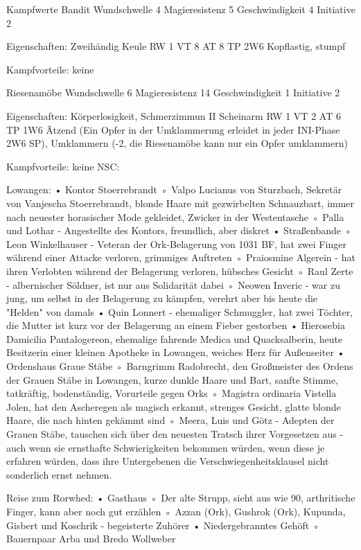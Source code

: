 Kampfwerte
Bandit
Wundschwelle 4
Magieresistenz 5
Geschwindigkeit 4
Initiative 2

Eigenschaften: Zweihändig
Keule		RW 1	VT 8	AT 8	TP 2W6
	Kopflastig, stumpf

Kampfvorteile: keine

Riesenamöbe
Wundschwelle 6
Magieresistenz 14
Geschwindigkeit 1
Initiative 2

Eigenschaften: Körperlosigkeit, Schmerzimmun II
Scheinarm	RW 1	VT 2	AT 6	TP 1W6
	Ätzend (Ein Opfer in der Umklammerung erleidet in jeder INI-Phase 2W6 SP), 	Umklammern (-2, die Riesenamöbe kann nur ein Opfer umklammern)

Kampfvorteile: keine
NSC:

Lowangen:
    • Kontor Stoerrebrandt
        ◦ Valpo Lucianus von Sturzbach, Sekretär von Vanjescha Stoerrebrandt, blonde Haare mit gezwirbelten Schnauzbart, immer nach neuester horasischer Mode gekleidet, Zwicker in der Westentasche
        ◦ Palla und Lothar - Angestellte des Kontors, freundlich, aber diskret
    • Straßenbande
        ◦ Leon Winkelhauser - Veteran der Ork-Belagerung von 1031 BF, hat zwei Finger während einer Attacke verloren, grimmiges Auftreten
        ◦ Praiosmine Algerein - hat ihren Verlobten während der Belagerung verloren, hübsches Gesicht
        ◦ Raul Zerte - albernischer Söldner, ist nur aus Solidarität dabei
        ◦ Neowen Inveric - war zu jung, um selbst in der Belagerung zu kämpfen, verehrt aber bis heute die "Helden" von damals
    • Quin Lonnert - ehemaliger Schmuggler, hat zwei Töchter, die Mutter ist kurz vor der Belagerung an einem Fieber gestorben
    • Hierosebia Damicilia Pantalogereon, ehemalige fahrende Medica und Quacksalberin, heute Besitzerin einer kleinen Apotheke in Lowangen, weiches Herz für Außenseiter
    • Ordenshaus Graue Stäbe
        ◦ Barngrimm Radobrecht, den Großmeister des Ordens der Grauen Stäbe in Lowangen, kurze dunkle Haare und Bart, sanfte Stimme, tatkräftig, bodenständig, Vorurteile gegen Orks
        ◦ Magistra ordinaria Vistella Jolen, hat den Ascheregen als magisch erkannt, strenges Gesicht, glatte blonde Haare, die nach hinten gekämmt sind
        ◦ Meera, Luis und Götz - Adepten der Grauen Stäbe, tauschen sich über den neuesten Tratsch ihrer Vorgesetzen aus - auch wenn sie ernsthafte Schwierigkeiten bekommen würden, wenn diese je erfahren würden, dass ihre Untergebenen die Verschwiegenheitsklausel nicht sonderlich ernst nehmen.

Reise zum Rorwhed:
    • Gasthaus
        ◦ Der alte Strupp, sieht aus wie 90, arthritische Finger, kann aber noch gut erzählen
        ◦ Azzan (Ork), Gushrok (Ork), Kupunda, Gisbert und Koschrik - begeisterte Zuhörer
    • Niedergebranntes Gehöft
        ◦ Bauernpaar Arba und Bredo Wollweber

